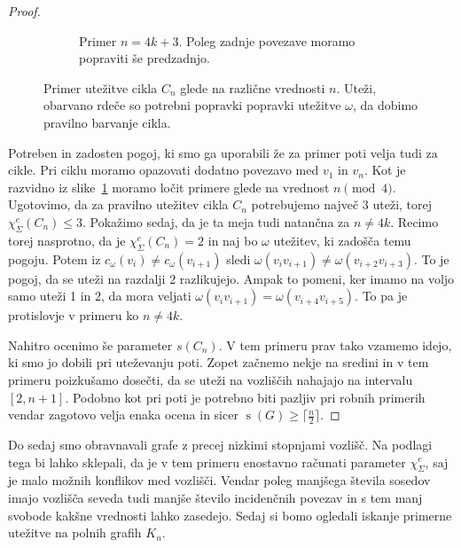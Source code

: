 \documentclass[12pt,a4paper,twoside]{article}
\theoremstyle{definition} %
\theoremstyle{plain} %
\newcommand{\ec}{\chi_{\Sigma}^e}
\numberwithin{equation}{section}  %
\DeclareMathOperator{\s}{s}
\begin{document}
\begin{proof}
\begin{figure}[]
\begin{subfigure}{0.475\textwidth}
		\caption{Primer $n = 4k + 3$. Poleg zadnje povezave moramo popraviti še predzadnjo.}
	\end{subfigure}
\caption{Primer utežitve cikla $C_n$ glede na različne vrednosti $n$. Uteži, obarvano rdeče so potrebni popravki popravki utežitve $\omega$, da dobimo pravilno barvanje cikla.}
\label{fig:cnall}
\end{figure}
Potreben in zadosten pogoj, ki smo ga uporabili že za primer poti velja tudi za cikle. Pri ciklu moramo opazovati dodatno povezavo med $v_1$ in $v_n$. Kot je razvidno iz slike~\ref{fig:cnall} moramo ločit primere glede na vrednost $n \pmod{4}$. Ugotovimo, da za pravilno utežitev cikla $C_n$ potrebujemo največ 3 uteži, torej $\ec(C_n) \le 3$. Pokažimo sedaj, da je ta meja tudi natančna za $n \neq 4k$. Recimo torej nasprotno, da je $\ec(C_n) = 2$ in naj bo $\omega$ utežitev, ki zadošča temu pogoju. Potem iz $c_{\omega}(v_i) \neq c_{\omega}(v_{i+1})$ sledi $\omega(v_i v_{i+1}) \neq \omega({v_{i+2} v_{i+3}})$. To je pogoj, da se uteži na razdalji $2$ razlikujejo. Ampak to pomeni, ker imamo na voljo samo uteži 1 in 2, da mora veljati $\omega(v_i v_{i+1}) = \omega({v_{i+4} v_{i+5}})$. To pa je protislovje v primeru ko $n \neq 4k$.

Nahitro ocenimo še parameter $s(C_n)$. V tem primeru prav tako vzamemo idejo, ki smo jo dobili pri uteževanju poti. Zopet začnemo nekje na sredini in v tem primeru poizkušamo dosečti, da se uteži na vozliščih nahajajo na intervalu $[2, n+1]$. Podobno kot pri poti je potrebno biti pazljiv pri robnih primerih vendar zagotovo velja enaka ocena in sicer $\s(G) \ge \lceil \frac{n}{2} \rceil$.
	
	
\end{proof}
Do sedaj smo obravnavali grafe z precej nizkimi stopnjami vozlišč. Na podlagi tega bi lahko sklepali, da je v tem primeru enostavno računati parameter $\ec$, saj je malo možnih konflikov med vozlišči. Vendar poleg manjšega števila sosedov imajo vozlišča seveda tudi manjše število incidenčnih povezav in s tem manj svobode kakšne vrednosti lahko zasedejo. Sedaj si bomo ogledali iskanje primerne utežitve na polnih grafih $K_n$. 
\end{document}
